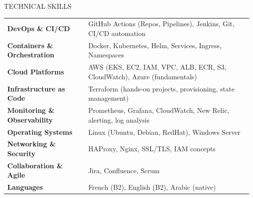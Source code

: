 \documentclass{resume}
\begin{document}
\begin{rSection}{TECHNICAL SKILLS}

\begin{tabular}{ @{} >{\bfseries}l @{\hspace{4ex}} l }

DevOps \& CI/CD 
& GitHub Actions (Repos, Pipelines), Jenkins, Git, CI/CD automation \\

Containers \& Orchestration 
& Docker, Kubernetes, Helm, Services, Ingress, Namespaces \\

Cloud Platforms 
& AWS (EKS, EC2, IAM, VPC, ALB, ECR, S3, CloudWatch), Azure (fundamentals) \\

Infrastructure as Code 
& Terraform (hands-on projects, provisioning, state management) \\

Monitoring \& Observability 
& Prometheus, Grafana, CloudWatch, New Relic, alerting, log analysis \\

Operating Systems 
& Linux (Ubuntu, Debian, RedHat), Windows Server \\

Networking \& Security 
& HAProxy, Nginx, SSL/TLS, IAM concepts \\

Collaboration \& Agile 
& Jira, Confluence, Scrum \\

Languages 
& French (B2), English (B2), Arabic (native) \\

\end{tabular}

\end{rSection}
\end{document}

